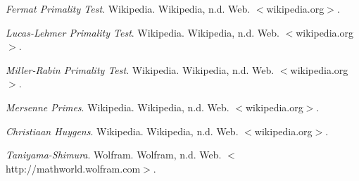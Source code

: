 \documentclass[11pt]{article}
\begin{document}
\begin{thebibliography}{9}
    \emph{Fermat Primality Test}. Wikipedia. Wikipedia, n.d. Web. $<$wikipedia.org$>$.

    \emph{Lucas-Lehmer Primality Test}.  Wikipedia. Wikipedia, n.d. Web. $<$wikipedia.org$>$.

    \emph{Miller-Rabin Primality Test}.  Wikipedia. Wikipedia, n.d. Web. $<$wikipedia.org$>$.

    \emph{Mersenne Primes}. Wikipedia. Wikipedia, n.d. Web. $<$wikipedia.org$>$.

    \emph{Christiaan Huygens}. Wikipedia. Wikipedia, n.d. Web. $<$wikipedia.org$>$.

    \emph{Taniyama-Shimura}. Wolfram. Wolfram, n.d. Web. $<$http://mathworld.wolfram.com$>$.
\end{thebibliography}
\end{document}

